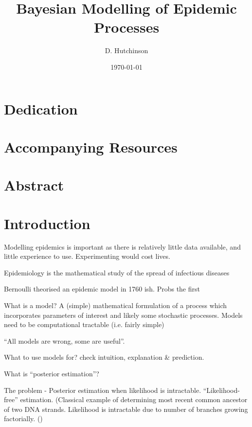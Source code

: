 \documentclass[11pt,a4paper]{article}
\theoremstyle{break}
\begin{document}
\title{Bayesian Modelling of Epidemic Processes}
\author{D. Hutchinson}
\date{\today}
\clearpage\maketitle
\thispagestyle{empty}

\newpage
\setcounter{page}{1}

\section*{Dedication}\label{sec_dedication}

\section*{Accompanying Resources}\label{sec_accompanying_resources}

\newpage
\section*{Abstract}\label{sec_abstract}

\newpage
\tableofcontents

\newpage
{}
\setcounter{page}{1}
\section{Introduction}\label{sec_introduction}

  \par Modelling epidemics is important as there is relatively little data available, and little experience to use. Experimenting would cost lives.
  \par Epidemiology is the mathematical study of the spread of infectious diseases
  \par Bernoulli theorised an epidemic model in 1760 ish. Probs the first
  \par What is a model? A (simple) mathematical formulation of a process which incorporates parameters of interest and likely some stochastic processes. Models need to be computational tractable (i.e. fairly simple)
  \par ``All models are wrong, some are useful''.
  \par What to use models for? check intuition, explanation \& prediction.
  \par What is ``posterior estimation''?
  \par The problem - Posterior estimation when likelihood is intractable. ``Likelihood-free'' estimation. (Classical example of determining most recent common ancestor of two DNA strands. Likelihood is intractable due to number of branches growing factorially. (\cite[]{selecting_summary_stats_in_ABC_for_calibration})
\end{document}
